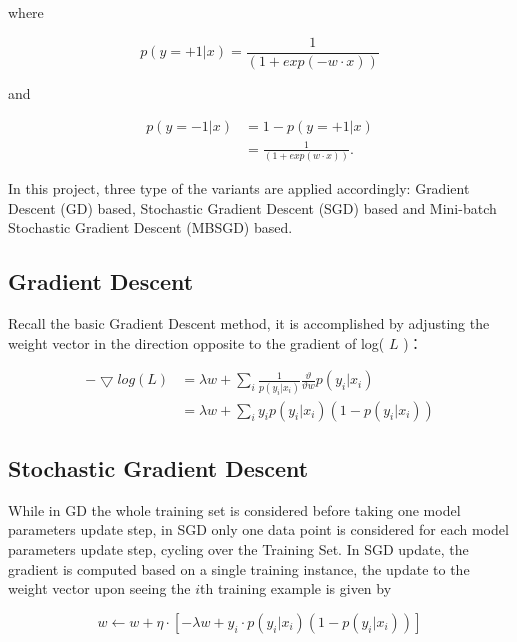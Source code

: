 \documentclass[sigconf]{acmart}
\begin{document}
where 

\begin{equation}
p(y=+1|x)= \frac{1}{(1+exp(-w \cdot x))}
\end{equation}

and

\begin{equation}
\begin{split}
p(y=-1|x) &= 1-p(y=+1|x) \\
  &=\frac{1}{(1+exp(w \cdot x))}.
\end{split}
\end{equation}

In this project, three type of the variants are applied accordingly: Gradient Descent (GD) based, Stochastic Gradient Descent (SGD) based and Mini-batch Stochastic Gradient Descent (MBSGD) based.

\subsection{Gradient Descent}
\label{subsection:logisticGD}

Recall the basic Gradient Descent method, it is accomplished by adjusting the weight vector in the direction opposite to the gradient of log( $L$ )：

\begin{equation}
\begin{split}
-\bigtriangledown log(L) &= \lambda w + \sum_i \frac{1}{p(y_i |x_i )} \frac{ \vartheta}{\vartheta w} p(y_i |x_i )  \\
  &=\lambda w + \sum_i y_i p(y_i |x_i )(1-p(y_i |x_i ))
\end{split}
\end{equation}

\subsection{Stochastic Gradient Descent}
\label{subsection:logisticSGD}

While in GD the whole training set is considered before taking one model parameters update step, in SGD only one data point is considered for each model parameters update step, cycling over the Training Set. \cite{bottou2010large} In SGD update, the gradient is computed based on a single training instance, the update to the weight vector upon seeing the $i$th training example is given by 

\begin{equation}
w \leftarrow w + \eta \cdot [ - \lambda w + y_i \cdot p( y_i | x_i )(1-p( y_i | x_i ))]
\end{equation}
\end{document}
